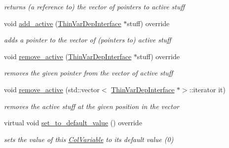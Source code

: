 \begin{Indent}
\begin{DoxyCompactItemize}
\begin{DoxyCompactList}\small\item\em returns (a reference to) the vector of pointers to active stuff \end{DoxyCompactList}\item 
void \mbox{\hyperlink{class_s_m_spp__di__unipi__it_1_1_col_variable_a0d6d3734871ae74a4d33fc5604fcd141}{add\+\_\+active}} (\mbox{\hyperlink{class_s_m_spp__di__unipi__it_1_1_thin_var_dep_interface}{Thin\+Var\+Dep\+Interface}} $\ast$stuff) override
\begin{DoxyCompactList}\small\item\em adds a pointer to the vector of (pointers to) active stuff \end{DoxyCompactList}\item 
void \mbox{\hyperlink{class_s_m_spp__di__unipi__it_1_1_col_variable_a03fd45a15a7b0b5dba25fe9f4ea983fe}{remove\+\_\+active}} (\mbox{\hyperlink{class_s_m_spp__di__unipi__it_1_1_thin_var_dep_interface}{Thin\+Var\+Dep\+Interface}} $\ast$stuff) override
\begin{DoxyCompactList}\small\item\em removes the given pointer from the vector of active stuff \end{DoxyCompactList}\item 
void \mbox{\hyperlink{class_s_m_spp__di__unipi__it_1_1_col_variable_a1237d53eba2afdcc0b24d117005b042e}{remove\+\_\+active}} (std\+::vector$<$ \mbox{\hyperlink{class_s_m_spp__di__unipi__it_1_1_thin_var_dep_interface}{Thin\+Var\+Dep\+Interface}} $\ast$$>$\+::iterator it)
\begin{DoxyCompactList}\small\item\em removes the active stuff at the given position in the vector \end{DoxyCompactList}\item 
virtual void \mbox{\hyperlink{class_s_m_spp__di__unipi__it_1_1_col_variable_a758f9e908f6d1156e1a16eacaee9a586}{set\+\_\+to\+\_\+default\+\_\+value}} () override
\begin{DoxyCompactList}\small\item\em sets the value of this \mbox{\hyperlink{class_s_m_spp__di__unipi__it_1_1_col_variable}{Col\+Variable}} to its default value (0) \end{DoxyCompactList}\end{DoxyCompactItemize}
\end{Indent}
